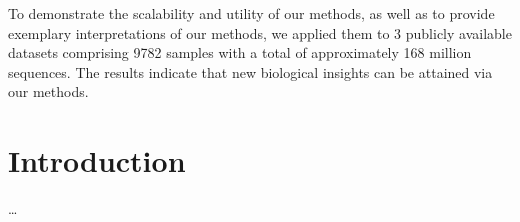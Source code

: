 \documentclass[10pt,letterpaper]{article}
\newcommand\todo[1]{{\color{purple}{#1}}}
\begin{document}
To demonstrate the scalability and utility of our methods,
as well as to provide exemplary interpretations of our methods,
we applied them to \num{3} publicly available datasets comprising \num{9 782} samples
with a total of approximately \num{168} million sequences.
The results indicate that new biological insights can be attained via our methods.

%
%


\linenumbers


\section*{Introduction}
\label{sec:Introduction}

\ldots
\end{document}
